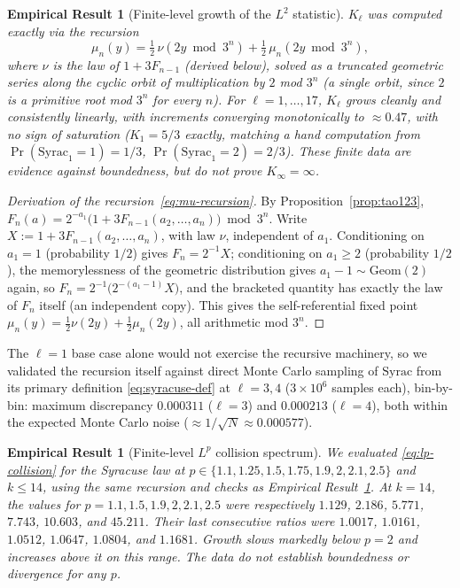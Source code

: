 \documentclass[11pt]{article}
\newtheorem{empirical}[theorem]{Empirical Result}
\theoremstyle{definition}
\theoremstyle{remark}
\begin{document}
\begin{empirical}[Finite-level growth of the $L^2$ statistic]
\label{thm:l2-finite}
$K_\ell$ was computed exactly via the recursion
\begin{equation}\label{eq:mu-recursion}
  \mu_n(y) = \tfrac12\,\nu(2y\bmod 3^n) + \tfrac12\,\mu_n(2y\bmod 3^n),
\end{equation}
where $\nu$ is the law of $1+3F_{n-1}$ (derived below), solved as a
truncated geometric series along the cyclic orbit of multiplication by
$2$ mod $3^n$ (a single orbit, since $2$ is a primitive root mod $3^n$
for every $n$). For $\ell=1,\dots,17$, $K_\ell$ grows cleanly and
consistently \emph{linearly}, with increments converging monotonically
to $\approx 0.47$, with no sign of saturation ($K_1=5/3$ exactly,
matching a hand computation from $\Pr(\mathrm{Syrac}_1=1)=1/3$,
$\Pr(\mathrm{Syrac}_1=2)=2/3$). These finite data are evidence against
boundedness, but do not prove $K_\infty=\infty$.
\end{empirical}

\begin{proof}[Derivation of the recursion~\eqref{eq:mu-recursion}]
By Proposition~\ref{prop:tao123}, $F_n(a) =
2^{-a_1}\bigl(1+3F_{n-1}(a_2,\dots,a_n)\bigr)\bmod 3^n$. Write
$X:=1+3F_{n-1}(a_2,\dots,a_n)$, with law $\nu$, independent of $a_1$.
Conditioning on $a_1=1$ (probability $1/2$) gives $F_n = 2^{-1}X$;
conditioning on $a_1\ge 2$ (probability $1/2$), the memorylessness of
the geometric distribution gives $a_1-1\sim\mathrm{Geom}(2)$ again, so
$F_n = 2^{-1}\bigl(2^{-(a_1-1)}X\bigr)$, and the bracketed quantity has
exactly the law of $F_n$ itself (an independent copy). This gives the
self-referential fixed point $\mu_n(y) = \tfrac12\nu(2y) +
\tfrac12\mu_n(2y)$, all arithmetic mod $3^n$.
\end{proof}

The $\ell=1$ base case alone would not exercise the recursive
machinery, so we validated the recursion itself against direct
Monte Carlo sampling of $\mathrm{Syrac}$ from its primary definition
\eqref{eq:syracuse-def} at $\ell=3,4$ ($3\times10^6$ samples each),
bin-by-bin: maximum discrepancy $0.000311$ ($\ell=3$) and $0.000213$
($\ell=4$), both within the expected Monte Carlo noise
($\approx 1/\sqrt{N}\approx 0.000577$).

\begin{empirical}[Finite-level $L^p$ collision spectrum]
\label{thm:lp-spectrum}
We evaluated \eqref{eq:lp-collision} for the Syracuse law at
$p\in\{1.1,1.25,1.5,1.75,1.9,2,2.1,2.5\}$ and $k\le14$, using the same
recursion and checks as Empirical Result~\ref{thm:l2-finite}. At $k=14$,
the values for $p=1.1,1.5,1.9,2,2.1,2.5$ were respectively
$1.129$, $2.186$, $5.771$, $7.743$, $10.603$, and $45.211$. Their last
consecutive ratios were $1.0017$, $1.0161$, $1.0512$, $1.0647$,
$1.0804$, and $1.1681$. Growth slows markedly below $p=2$ and increases
above it on this range. The data do not establish boundedness or
divergence for any $p$.
\end{empirical}
\end{document}
